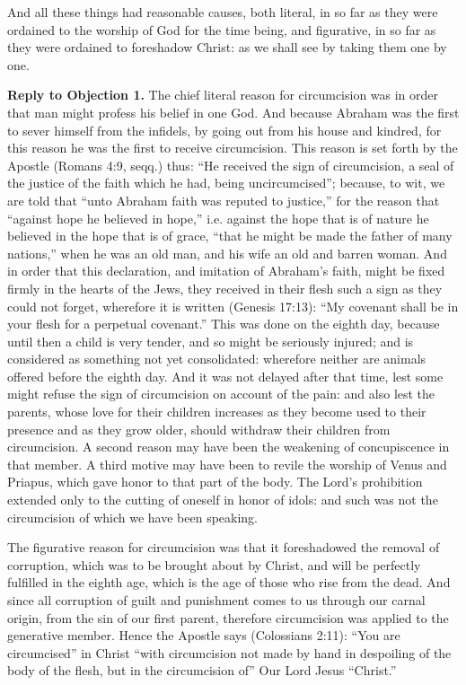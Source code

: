 And all these things had reasonable causes, both literal, in so far as they were ordained to the worship of God for the time being, and figurative, in so far as they were ordained to foreshadow Christ: as we shall see by taking them one by one.

\textbf{Reply to Objection 1.} The chief literal reason for circumcision was in order that man might profess his belief in one God. And because Abraham was the first to sever himself from the infidels, by going out from his house and kindred, for this reason he was the first to receive circumcision. This reason is set forth by the Apostle (Romans 4:9, seqq.) thus: ``He received the sign of circumcision, a seal of the justice of the faith which he had, being uncircumcised''; because, to wit, we are told that ``unto Abraham faith was reputed to justice,'' for the reason that ``against hope he believed in hope,'' i.e. against the hope that is of nature he believed in the hope that is of grace, ``that he might be made the father of many nations,'' when he was an old man, and his wife an old and barren woman. And in order that this declaration, and imitation of Abraham's faith, might be fixed firmly in the hearts of the Jews, they received in their flesh such a sign as they could not forget, wherefore it is written (Genesis 17:13): ``My covenant shall be in your flesh for a perpetual covenant.'' This was done on the eighth day, because until then a child is very tender, and so might be seriously injured; and is considered as something not yet consolidated: wherefore neither are animals offered before the eighth day. And it was not delayed after that time, lest some might refuse the sign of circumcision on account of the pain: and also lest the parents, whose love for their children increases as they become used to their presence and as they grow older, should withdraw their children from circumcision. A second reason may have been the weakening of concupiscence in that member. A third motive may have been to revile the worship of Venus and Priapus, which gave honor to that part of the body. The Lord's prohibition extended only to the cutting of oneself in honor of idols: and such was not the circumcision of which we have been speaking.

The figurative reason for circumcision was that it foreshadowed the removal of corruption, which was to be brought about by Christ, and will be perfectly fulfilled in the eighth age, which is the age of those who rise from the dead. And since all corruption of guilt and punishment comes to us through our carnal origin, from the sin of our first parent, therefore circumcision was applied to the generative member. Hence the Apostle says (Colossians 2:11): ``You are circumcised'' in Christ ``with circumcision not made by hand in despoiling of the body of the flesh, but in the circumcision of'' Our Lord Jesus ``Christ.''

